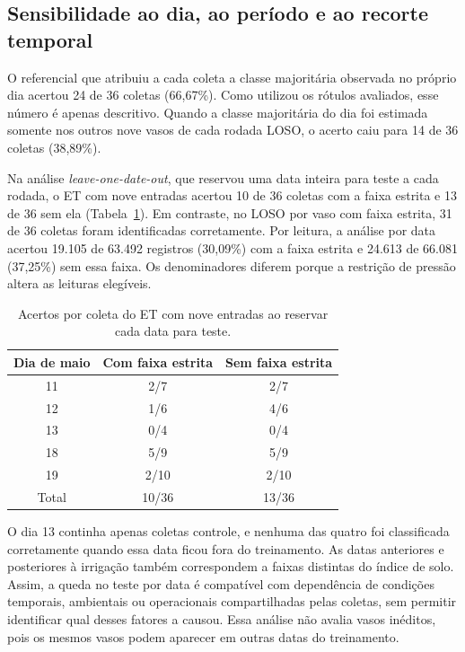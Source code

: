 \subsection{Sensibilidade ao dia, ao período e ao recorte temporal}
\label{subsec:resultados_sensibilidade_temporal}

O referencial que atribuiu a cada coleta a classe majoritária observada
no próprio dia acertou 24 de 36 coletas (66,67\%). Como utilizou os
rótulos avaliados, esse número é apenas descritivo. Quando a classe
majoritária do dia foi estimada somente nos outros nove vasos de cada
rodada LOSO, o acerto caiu para 14 de 36 coletas (38,89\%).

Na análise \textit{leave-one-date-out}, que reservou uma data inteira
para teste a cada rodada, o ET com nove entradas acertou 10 de 36
coletas com a faixa estrita e 13 de 36 sem ela
(Tabela~\ref{tab:validacao_data_fora}). Em contraste, no LOSO por vaso
com faixa estrita, 31 de 36 coletas foram identificadas corretamente.
Por leitura, a análise por data acertou 19.105 de 63.492 registros
(30,09\%) com a faixa estrita e 24.613 de 66.081 (37,25\%) sem essa
faixa. Os denominadores diferem porque a restrição de pressão altera
as leituras elegíveis.

\begin{table}[htbp]
    \centering
    \footnotesize
    \caption{Acertos por coleta do ET com nove entradas ao reservar cada data para teste.}
    \label{tab:validacao_data_fora}
    \begin{tabular}{ccc}
        \hline
        Dia de maio & Com faixa estrita & Sem faixa estrita \\
        \hline
        11 & 2/7 & 2/7 \\
        12 & 1/6 & 4/6 \\
        13 & 0/4 & 0/4 \\
        18 & 5/9 & 5/9 \\
        19 & 2/10 & 2/10 \\
        \hline
        Total & 10/36 & 13/36 \\
        \hline
    \end{tabular}
\end{table}

O dia 13 continha apenas coletas controle, e nenhuma das quatro foi
classificada corretamente quando essa data ficou fora do treinamento.
As datas anteriores e posteriores à irrigação também correspondem a
faixas distintas do índice de solo. Assim, a queda no teste por data é
compatível com dependência de condições temporais, ambientais ou
operacionais compartilhadas pelas coletas, sem permitir identificar
qual desses fatores a causou. Essa análise não avalia vasos inéditos,
pois os mesmos vasos podem aparecer em outras datas do treinamento.

